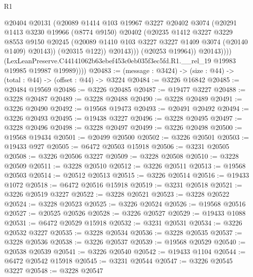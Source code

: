 \begin{lexlean}{R1}
\begin{coremodule}
                        @20404
                        @20131
                        (@20089
                          @1414
                          @103
                          @19967
                          @3227
                          @20402
                          @3074
                          (@20291
                            @1413
                            @3230
                            @19966
                            (@8774 @9150)
                            @20402
                            (@20235
                              @1412
                              @3227
                              @3229
                              @8553
                              @9150
                              @20245
                              (@20089 @1410 @103 @3227 @3227 @1409 @3074 (@20140 @1409) @20143))
                            (@20315 @122))
                          @20143)))
                    (@20253 @19964))
                  @20143))))
          (LexLeanPreserve.C44141062b63ebef453c0eb035f3ec5fd.R1.__rel_19
            @19983
            @19985
            @19987
            @19989))))
@20483 := (message : @3424) -> (size : @44) -> (total : @44) -> (offset : @44) -> @3224
@20484 := @3226 @16842
@20485 := @20484 @19569
@20486 := @3226 @20485
@20487 := @19477 @3227
@20488 := @3228 @20487
@20489 := @3228 @20488
@20490 := @3228 @20489
@20491 := @3226 @20490
@20492 := @19568 @19473
@20493 := @20491 @20492
@20494 := @3226 @20493
@20495 := @19438 @3227
@20496 := @3228 @20495
@20497 := @3228 @20496
@20498 := @3228 @20497
@20499 := @3226 @20498
@20500 := @19568 @19434
@20501 := @20499 @20500
@20502 := @3226 @20501
@20503 := @19433 @927
@20505 := @6472 @20503 @15918
@20506 := @3231 @20505
@20508 := @3226 @20506 @3227
@20509 := @3228 @20508
@20510 := @3228 @20509
@20511 := @3228 @20510
@20512 := @3226 @20511
@20513 := @19568 @20503
@20514 := @20512 @20513
@20515 := @3226 @20514
@20516 := @19433 @1072
@20518 := @6472 @20516 @15918
@20519 := @3231 @20518
@20521 := @3226 @20519 @3227
@20522 := @3228 @20521
@20523 := @3228 @20522
@20524 := @3228 @20523
@20525 := @3226 @20524
@20526 := @19568 @20516
@20527 := @20525 @20526
@20528 := @3226 @20527
@20529 := @19433 @1088
@20531 := @6472 @20529 @15918
@20532 := @3231 @20531
@20534 := @3226 @20532 @3227
@20535 := @3228 @20534
@20536 := @3228 @20535
@20537 := @3228 @20536
@20538 := @3226 @20537
@20539 := @19568 @20529
@20540 := @20538 @20539
@20541 := @3226 @20540
@20542 := @19433 @1104
@20544 := @6472 @20542 @15918
@20545 := @3231 @20544
@20547 := @3226 @20545 @3227
@20548 := @3228 @20547

\end{coremodule}
\end{lexlean}
